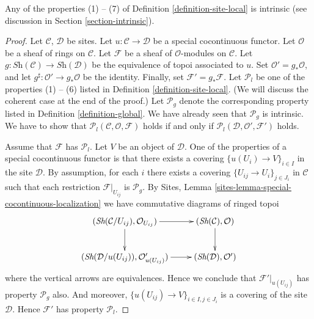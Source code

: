 \begin{lemma}
\label{lemma-special-locally-free}
Any of the properties (1) -- (7) of Definition \ref{definition-site-local}
is intrinsic (see discussion in Section \ref{section-intrinsic}).
\end{lemma}

\begin{proof}
Let $\mathcal{C}$, $\mathcal{D}$ be sites.
Let $u : \mathcal{C} \to \mathcal{D}$ be a special cocontinuous functor.
Let $\mathcal{O}$ be a sheaf of rings on $\mathcal{C}$.
Let $\mathcal{F}$ be a sheaf of $\mathcal{O}$-modules on $\mathcal{C}$.
Let $g : \textit{Sh}(\mathcal{C}) \to \textit{Sh}(\mathcal{D})$
be the equivalence of topoi associated to $u$.
Set $\mathcal{O}' = g_*\mathcal{O}$, and let
$g^\sharp : \mathcal{O}' \to g_*\mathcal{O}$ be the identity.
Finally, set $\mathcal{F}' = g_*\mathcal{F}$.
Let $\mathcal{P}_l$ be one of the properties (1) -- (6) listed in
Definition \ref{definition-site-local}.
(We will discuss the coherent case at the end of the proof.)
Let $\mathcal{P}_g$ denote the corresponding property listed in
Definition \ref{definition-global}. We have already seen that
$\mathcal{P}_g$ is intrinsic.
We have to show that
$\mathcal{P}_l(\mathcal{C}, \mathcal{O}, \mathcal{F})$
holds if and only if
$\mathcal{P}_l(\mathcal{D}, \mathcal{O}', \mathcal{F}')$
holds.

\medskip\noindent
Assume that $\mathcal{F}$ has $\mathcal{P}_l$.
Let $V$ be an object of $\mathcal{D}$.
One of the properties of a special cocontinuous functor is that there exists
a covering $\{u(U_i) \to V\}_{i \in I}$ in the site $\mathcal{D}$.
By assumption, for each $i$ there exists a covering
$\{U_{ij} \to U_i\}_{j \in J_i}$ in $\mathcal{C}$ such that
each restriction $\mathcal{F}|_{U_{ij}}$ is $\mathcal{P}_g$.
By Sites, Lemma \ref{sites-lemma-special-cocontinuous-localization}
we have commutative diagrams of ringed topoi
$$
\xymatrix{
(\textit{Sh}(\mathcal{C}/U_{ij}), \mathcal{O}_{U_{ij}}) \ar[r] \ar[d] &
(\textit{Sh}(\mathcal{C}), \mathcal{O}) \ar[d] \\
(\textit{Sh}(\mathcal{D}/u(U_{ij})), \mathcal{O}'_{u(U_{ij})}) \ar[r] &
(\textit{Sh}(\mathcal{D}), \mathcal{O}')
}
$$
where the vertical arrows are equivalences. Hence we conclude that
$\mathcal{F}'|_{u(U_{ij})}$ has property $\mathcal{P}_g$ also.
And moreover, $\{u(U_{ij}) \to V\}_{i \in I, j \in J_i}$ is a
covering of the site $\mathcal{D}$. Hence $\mathcal{F}'$ has
property $\mathcal{P}_l$.


\end{proof}
